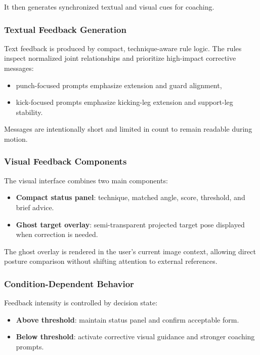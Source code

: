 \documentclass[12pt]{article}
\begin{document}
{It then generates synchronized textual and visual cues for coaching.

\subsubsection{Textual Feedback Generation}

Text feedback is produced by compact, technique-aware rule logic. The rules inspect normalized joint relationships and prioritize high-impact corrective messages:

\begin{itemize}
    \item punch-focused prompts emphasize extension and guard alignment,
    \item kick-focused prompts emphasize kicking-leg extension and support-leg stability.
\end{itemize}

Messages are intentionally short and limited in count to remain readable during motion.

\subsubsection{Visual Feedback Components}

The visual interface combines two main components:

\begin{itemize}
    \item \textbf{Compact status panel}: technique, matched angle, score, threshold, and brief advice.
    \item \textbf{Ghost target overlay}: semi-transparent projected target pose displayed when correction is needed.
\end{itemize}

The ghost overlay is rendered in the user's current image context, allowing direct posture comparison without shifting attention to external references.

\subsubsection{Condition-Dependent Behavior}

Feedback intensity is controlled by decision state:

\begin{itemize}
    \item \textbf{Above threshold}: maintain status panel and confirm acceptable form.
    \item \textbf{Below threshold}: activate corrective visual guidance and stronger coaching prompts.
\end{itemize}

}
\end{document}
